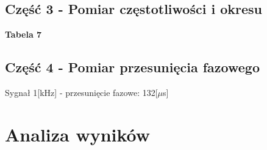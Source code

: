 \documentclass[11pt]{article}
\begin{document}
    \subsection*{Część 3 - Pomiar częstotliwości i okresu}
    \begin{center}
        \small{\textbf{Tabela 7}}
    \end{center}
    \begin{center}
    \end{center}

    \subsection*{Część 4 - Pomiar przesunięcia fazowego}
    \begin{center}
        Sygnał 1[kHz] - przesunięcie fazowe: 132[$\mu$s]
    \end{center}
    \newpage
    \section{Analiza wyników}
\end{document}
